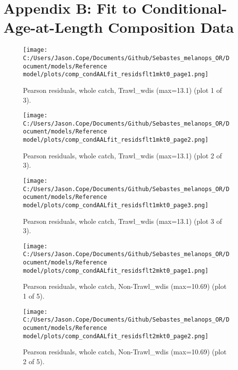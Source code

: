 \documentclass[11pt,
  english,
  letterpaper,
]{article}
\begin{document}
\clearpage

\hypertarget{app-b}{%
\section{Appendix B: Fit to Conditional-Age-at-Length Composition Data}\label{app-b}}

\begin{figure}
\centering
\texttt{[image: C:/Users/Jason.Cope/Documents/Github/Sebastes\_melanops\_OR/Document/models/Reference model/plots/comp\_condAALfit\_residsflt1mkt0\_page1.png]}
\caption{Pearson residuals, whole catch, Trawl\_wdis (max=13.1) (plot 1 of 3).\label{fig:comp_condAALfit_residsflt1mkt0_page1}}
\end{figure}

\begin{figure}
\centering
\texttt{[image: C:/Users/Jason.Cope/Documents/Github/Sebastes\_melanops\_OR/Document/models/Reference model/plots/comp\_condAALfit\_residsflt1mkt0\_page2.png]}
\caption{Pearson residuals, whole catch, Trawl\_wdis (max=13.1) (plot 2 of 3).\label{fig:comp_condAALfit_residsflt1mkt0_page2}}
\end{figure}

\begin{figure}
\centering
\texttt{[image: C:/Users/Jason.Cope/Documents/Github/Sebastes\_melanops\_OR/Document/models/Reference model/plots/comp\_condAALfit\_residsflt1mkt0\_page3.png]}
\caption{Pearson residuals, whole catch, Trawl\_wdis (max=13.1) (plot 3 of 3).\label{fig:comp_condAALfit_residsflt1mkt0_page3}}
\end{figure}

\begin{figure}
\centering
\texttt{[image: C:/Users/Jason.Cope/Documents/Github/Sebastes\_melanops\_OR/Document/models/Reference model/plots/comp\_condAALfit\_residsflt2mkt0\_page1.png]}
\caption{Pearson residuals, whole catch, Non-Trawl\_wdis (max=10.69) (plot 1 of 5).\label{fig:comp_condAALfit_residsflt2mkt0_page1}}
\end{figure}

\begin{figure}
\centering
\texttt{[image: C:/Users/Jason.Cope/Documents/Github/Sebastes\_melanops\_OR/Document/models/Reference model/plots/comp\_condAALfit\_residsflt2mkt0\_page2.png]}
\caption{Pearson residuals, whole catch, Non-Trawl\_wdis (max=10.69) (plot 2 of 5).\label{fig:comp_condAALfit_residsflt2mkt0_page2}}
\end{figure}
\end{document}
